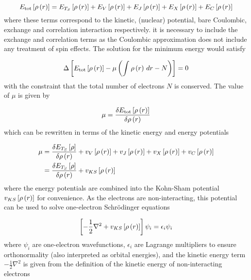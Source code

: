 \begin{equation}
    E_{\text{tot}} \left[ \rho\left(r\right) \right] = E_{T_S} \left[ \rho\left(r\right) \right] + E_{V} \left[ \rho\left(r\right) \right] + E_{J} \left[ \rho\left(r\right) \right] + E_{X} \left[ \rho\left(r\right) \right] + E_{C} \left[ \rho\left(r\right) \right]
\end{equation}
%
where these terms correspond to the kinetic, (nuclear) potential, bare Coulombic,
exchange and correlation interaction respectively. it is necessary to include the 
exchange and correlation terms as the Coulombic approximation does not include any
treatment of spin effects. The solution for the minimum energy would satisfy

\begin{equation}
    \Delta \left[  E_{\text{tot}} \left[ \rho\left(r\right) \right]  - \mu \left( \int_{}^{} \rho\left(r\right) \,dr - N \right) \right] = 0
\end{equation}
%
with the constraint that the total number of electrons $N$ is conserved. The value
of $\mu$ is given by

\begin{equation}
    \mu = \frac{\delta  E_{\text{tot}} \left[ \rho\left(r\right) \right]}{\delta \rho\left(r\right)}
\end{equation}
%
which can be rewritten in terms of the kinetic energy and energy potentials

\begin{equation}
    \begin{split}
        \mu &= \frac{\delta  E_{T_S} \left[ \rho \right]}{\delta \rho\left(r\right)} + v_{V} \left[ \rho\left(r\right) \right] + v_{J} \left[ \rho\left(r\right) \right] + v_{X} \left[ \rho\left(r\right) \right] + v_{C} \left[ \rho\left(r\right) \right] \\
            &= \frac{\delta  E_{T_S} \left[ \rho \right]}{\delta \rho\left(r\right)} + v_{KS} \left[ \rho\left(r\right) \right]
    \end{split}
\end{equation}
%
where the energy potentials are combined into the Kohn-Sham potential $v_{KS} \left[ \rho\left(r\right) \right]$ for
convenience. As the electrons are non-interacting, this potential can be used to
solve one-electron Schrödinger equations

\begin{equation}
    \left[ -\frac{1}{2} \nabla^2 + v_{KS} \left[ \rho\left(r\right) \right] \right] \psi_i = \epsilon_i \psi_i
\end{equation}
%
where $\psi_i$ are one-electron wavefunctions, $\epsilon_i$ are Lagrange multipliers
to ensure orthonormality (also interpreted as orbital energies), and the kinetic 
energy term $-\frac{1}{2} \nabla ^2$ is given from the definition of the kinetic 
energy of non-interacting electrons


